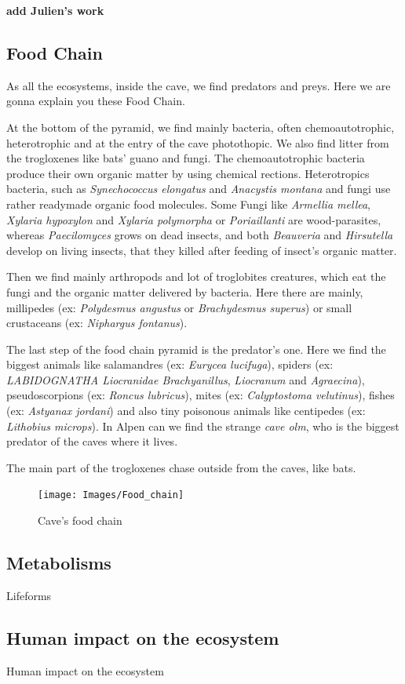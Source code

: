 \documentclass{article}
\begin{document}
\textbf{add Julien's work}

\clearpage

\subsection{Food Chain}

As all  the ecosystems, inside the cave, we find predators and preys. Here we are gonna explain you these Food Chain. \\
\par
At the bottom of the pyramid, we find mainly bacteria, often chemoautotrophic, heterotrophic and at the entry of the cave photothopic. We also find litter from the trogloxenes like bats’ guano and fungi. The chemoautotrophic bacteria produce their own organic matter by using chemical rections. Heterotropics bacteria, such as \emph{Synechococcus elongatus} and \emph{Anacystis montana}  and fungi use rather readymade organic food molecules. Some Fungi like \emph{Armellia mellea}, \emph{Xylaria hypoxylon} and \emph{Xylaria polymorpha} or \emph{Poriaillanti} are wood-parasites, whereas \emph{Paecilomyces} grows on dead insects, and both \emph{Beauveria} and \emph{Hirsutella} develop on living insects, that they killed after feeding of insect’s organic matter. \\
\par
Then we find mainly arthropods and lot of troglobites creatures, which eat the fungi and the organic matter delivered by bacteria. Here there are mainly, millipedes (ex: \emph{Polydesmus angustus} or \emph{Brachydesmus superus}) or small crustaceans (ex: \emph{Niphargus fontanus}). \\
\par
The last step of the food chain pyramid is the predator’s one. Here we find the biggest animals like salamandres (ex: \emph{Eurycea lucifuga}), spiders (ex: \emph{LABIDOGNATHA Liocranidae Brachyanillus}, \emph{Liocranum} and \emph{Agraecina}), pseudoscorpions (ex: \emph{Roncus lubricus}), mites (ex: \emph{Calyptostoma velutinus}), fishes (ex: \emph{Astyanax jordani}) and also tiny poisonous animals like centipedes (ex:\emph{ Lithobius microps}). In Alpen can we find the strange \emph{cave olm}, who is the biggest predator of the caves where it lives. \\
\par
The main part of the trogloxenes chase outside from the caves, like bats.

\begin{figure}[!ht]
  \centering
  \texttt{[image: Images/Food\_chain]}
  \caption{Cave's food chain \cite{FoodChainPyramid}}
\end{figure}

\subsection{Metabolisms}

Lifeforms

\subsection{Human impact on the ecosystem}

Human impact on the ecosystem
\nocite{*}


\end{document}
